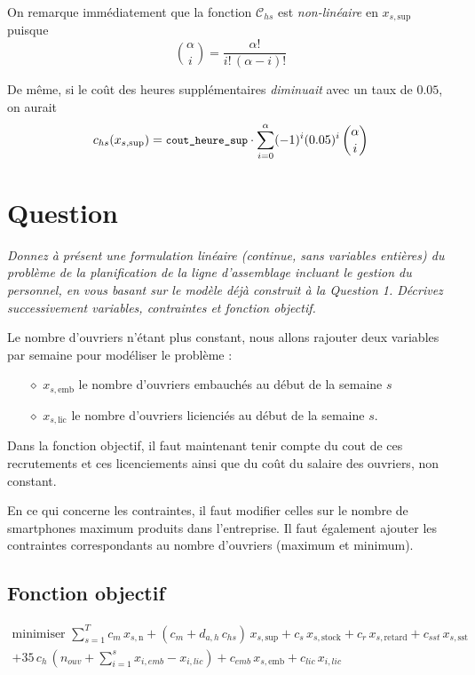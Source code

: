 \documentclass[12pt,oneside,a4paper]{article}
\newcommand{\question}
{
\addtocounter{section}{1}
\section*{Question \thesection}
}
\newcommand{\myX}[2]{x_{#1,\text{#2}}}
\newcommand{\xSemaine}[1]{\myX{s}{#1}}
\newcommand{\xn}{\xSemaine{n}}
\newcommand{\xsup}{\xSemaine{sup}}
\newcommand{\xstock}{\xSemaine{stock}}
\newcommand{\xretard}{\xSemaine{retard}}
\newcommand{\xsst}{\xSemaine{sst}}
\newcommand{\xemb}{\xSemaine{emb}}
\newcommand{\xlic}{\xSemaine{lic}}
\newcommand{\texttts}[1]{{\small\texttt{#1}}}
\begin{document}
On remarque immédiatement que la fonction $\mathcal{C}_{hs}$
est \emph{non-linéaire} en $\xsup$ puisque 
\[ \binom{\alpha}{i} =\frac{\alpha !}{i!\,(\alpha-i)!} \]

De même, si le coût des heures supplémentaires \emph{diminuait} 
avec un taux de $0.05$,
on aurait
\[
  c_{hs} (\xsup) = \texttts{cout\_heure\_sup} \cdot
  \sum_{i=0}^{\alpha} (-1)^i(0.05)^{i} \,   \binom{\alpha}{i}
\]


\question %
\emph{Donnez à présent une formulation linéaire (continue, sans variables
entières) du problème de la planification de la ligne d'assemblage
incluant le gestion du personnel, en vous basant sur le modèle déjà 
construit à la Question 1. Décrivez successivement variables, 
contraintes et fonction objectif.}

Le nombre d'ouvriers n'étant plus constant, nous allons rajouter deux variables
par semaine pour modéliser le problème :
\begin{itemize}
  \item[$\diamond$] $\xemb$ le nombre d'ouvriers embauchés au début de la semaine $s$
  \item[$\diamond$] $\xlic$ le nombre d'ouvriers licienciés au début de la semaine $s$.
\end{itemize}
Dans la fonction objectif, il faut maintenant tenir compte du cout de 
ces recrutements et ces licenciements 
ainsi que du coût du salaire des ouvriers, non constant.

En ce qui concerne les contraintes, il faut modifier celles sur 
le nombre de smartphones maximum produits dans l'entreprise. 
Il faut également ajouter les contraintes correspondants 
au nombre d'ouvriers (maximum et minimum).

\subsection*{Fonction objectif}
\begin{align*}
  \mbox{minimiser } 
  \sum_{s=1}^{T} 
  c_m\, \xn + (c_m + d_{a,h} \, c_{hs})\, \xsup
  + c_s\, \xstock + c_r\, \xretard + c_{sst}\, \xsst \\
  + 35 \, c_{h} \, (n_{ouv} + \sum_{i=1}^{s} x_{i,emb} - x_{i,lic}) 
  + c_{emb} \, \xemb + c_{lic} \, x_{i,lic}
\end{align*}
\end{document}
